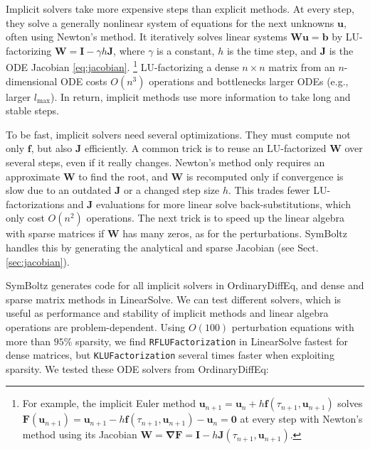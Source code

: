 \documentclass{aa}
\newcommand\lmax{l_\text{max}}
\begin{document}
Implicit solvers take more expensive steps than explicit methods.
At every step, they solve a generally nonlinear system of equations for the next unknowns $\boldsymbol{u}$, often using Newton's method.
It iteratively solves linear systems $\boldsymbol{W} \boldsymbol{u} = \boldsymbol{b}$
by LU-factorizing $\boldsymbol{W} = \boldsymbol{I} - \gamma h \boldsymbol{J}$,
where $\gamma$ is a constant, $h$ is the time step, and $\boldsymbol{J}$ is the ODE Jacobian \eqref{eq:jacobian}.%
\footnote{
For example, the implicit Euler method $\boldsymbol{u}_{n+1} = \boldsymbol{u}_n + h \boldsymbol{f}(\tau_{n+1}, \boldsymbol{u}_{n+1})$ solves
$\boldsymbol{F}(\boldsymbol{u}_{n+1}) = \boldsymbol{u}_{n+1} - h \boldsymbol{f}(\tau_{n+1}, \boldsymbol{u}_{n+1}) - \boldsymbol{u}_n = \boldsymbol{0}$ at every step with Newton's method
using its Jacobian $\boldsymbol{W} = \boldsymbol{\nabla} \boldsymbol{F} = \boldsymbol{I} - h \boldsymbol{J}(\tau_{n+1},\boldsymbol{u}_{n+1})$.
}
LU-factorizing a dense $n \times n$ matrix from an $n$-dimensional ODE costs $O(n^3)$ operations
and bottlenecks larger ODEs (e.g., larger $\lmax$).
In return, implicit methods use more information to take long and stable steps.

To be fast, implicit solvers need several optimizations.
They must compute not only $\boldsymbol{f}$, but also $\boldsymbol{J}$ efficiently.
A common trick is to reuse an LU-factorized $\boldsymbol{W}$ over several steps, even if it really changes.
Newton's method only requires an approximate $\boldsymbol{W}$ to find the root,
and $\boldsymbol{W}$ is recomputed only if convergence is slow due to an outdated $\boldsymbol{J}$ or a changed step size $h$.
This trades fewer LU-factorizations and $\boldsymbol{J}$ evaluations for more linear solve back-substitutions, which only cost $O(n^2)$ operations.
The next trick is to speed up the linear algebra with sparse matrices if $\boldsymbol{W}$ has many zeros, as for the perturbations.
SymBoltz handles this by generating the analytical and sparse Jacobian (see Sect. \ref{sec:jacobian}).

SymBoltz generates code for all implicit solvers in OrdinaryDiffEq, and dense and sparse matrix methods in LinearSolve.
We can test different solvers, which is useful as performance and stability of implicit methods and linear algebra operations are problem-dependent.
Using $O(100)$ perturbation equations with more than $95\%$ sparsity, we find \texttt{RFLUFactorization} in LinearSolve fastest for dense matrices, but \texttt{KLUFactorization} several times faster when exploiting sparsity.
We tested these ODE solvers from OrdinaryDiffEq:
\end{document}
